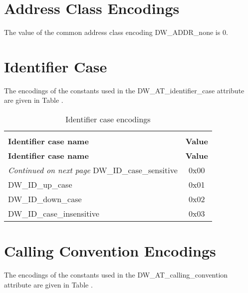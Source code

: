 \section{Address Class Encodings}
\label{datarep:addressclassencodings}

The value of the common address class encoding 
DW\-\_ADDR\-\_none is 0.


\section{Identifier Case}
\label{datarep:identifiercase}

The encodings of the constants used in the 
DW\-\_AT\-\_identifier\-\_case attribute are given in 
Table .

\begin{centering}
\setlength{\extrarowheight}{0.1cm}
\begin{longtable}{l|c}
  \caption{Identifier case encodings} \label{tab:identifiercaseencodings}\\
  \hline \\ \bfseries Identifier case name&\bfseries Value \\ \hline
\endfirsthead
  \bfseries Identifier case name&\bfseries Value\\ \hline
\endhead
  \hline \emph{Continued on next page}
\endfoot
  \hline
\endlastfoot
DW\-\_ID\-\_case\-\_sensitive&0x00     \\
DW\-\_ID\-\_up\-\_case&0x01     \\
DW\-\_ID\-\_down\-\_case&0x02     \\
DW\-\_ID\-\_case\-\_insensitive&0x03     \\
\end{longtable}
\end{centering}

\section{Calling Convention Encodings}
\label{datarep:callingconventionencodings}
The encodings of the constants used in the 
DW\-\_AT\-\_calling\-\_convention attribute are given in
Table .

